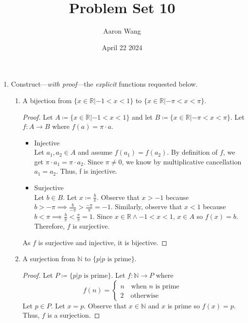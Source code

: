 \documentclass{article}
\title{Problem Set 10}
\author{Aaron Wang}
\date{April 22 2024}
\newcommand{\defeq}{\coloneqq}
\newcommand{\naturals}{\mathbb{N}}
\newcommand{\reals}{\mathbb{R}}
\begin{document}
\maketitle
\begin{enumerate}
    \item  Construct---\emph{with proof}---the \emph{explicit} functions requested below.
    \begin{enumerate}
      \item A bijection from $\{x \in \reals | -1 < x < 1\}$ to $\{x \in \reals | -\pi < x < \pi\}$.
      \begin{proof}
          Let $A \defeq \{x \in \reals | -1 < x < 1\}$ and let $B \defeq\{x \in \reals | -\pi < x < \pi\}$.
          Let $f:A \to B$ where $f(a)=\pi \cdot a$.
          \begin{itemize}
            \item Injective\\ Let $a_1,a_2 \in A$ and assume $f(a_1)=f(a_2)$. By definition of $f$, we get $\pi \cdot a_1=\pi \cdot a_2$. Since $\pi \neq 0$, we know by multiplicative cancellation $a_1=a_2$. Thus, f is injective.
            \item Surjective\\ Let $b \in B$. Let $x \defeq \frac{b}{\pi}$. Observe that $x > -1$ because $b>-\pi \implies \frac{b}{-\pi}>\frac{-\pi}{\pi}=-1$. Similarly, observe that $x < 1$ because $b<\pi \implies \frac{b}{\pi}<\frac{\pi}{\pi}=1$. Since $x \in \reals \land -1 < x < 1$, $x \in A$ so $f(x)=b$. Therefore, $f$ is surjective.      
          \end{itemize}
          As $f$ is surjective and injective, it is bijective.
      \end{proof}
      \item A surjection from $\naturals$ to $\{p | p \text{ is prime}\}$.
      \begin{proof}
          Let $P \defeq \{p | p \text{ is prime}\}$. Let $f:\naturals \to P$ where 
          \[f(n)=
          \begin{cases}
              n \quad \text{when $n$ is prime }\\
              2 \quad \text{otherwise}
          \end{cases}
          \]
        Let $p \in P$. Let $x=p$. Observe that $x \in \naturals$ and $x$ is prime so $f(x)=p$. Thus, $f$ is a surjection.
      \end{proof} 


\end{enumerate}
\end{enumerate}
\end{document}
